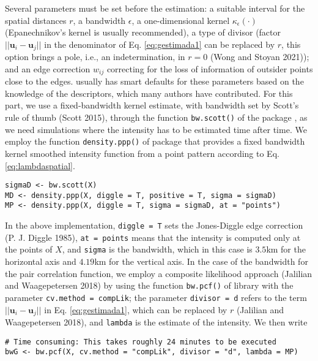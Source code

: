 Several parameters must be set before the estimation: a suitable interval for the spatial distances \(r\), a bandwidth \(\epsilon\), a one-dimensional kernel \(\kappa_{\epsilon}(\cdot)\) (Epanechnikov's kernel is usually recommended), a type of divisor (factor \(||\mathbf{u}_{i}-\mathbf{u}_{j}||\) in the denominator of Eq. \eqref{eq:gestimada1} can be replaced by \(r\), this option brings a pole, i.e., an indetermination, in \(r=0\) (Wong and Stoyan 2021)); and an edge correction \(w_{ij}\) correcting for the loss of information of outsider points close to the edges.  usually has smart defaults for these parameters based on the knowledge of the descriptors, which many authors have contributed. For this part, we use a fixed-bandwidth kernel estimate, with bandwidth set by Scott's rule of thumb (Scott 2015), through the function \texttt{bw.scott()} of the package , as we need simulations where the intensity has to be estimated time after time. We employ the function \texttt{density.ppp()} of package  that provides a fixed bandwidth kernel smoothed intensity function from a point pattern according to Eq. \eqref{eq:lambdaspatial}.

\begin{verbatim}
sigmaD <- bw.scott(X)
MD <- density.ppp(X, diggle = T, positive = T, sigma = sigmaD)
MP <- density.ppp(X, diggle = T, sigma = sigmaD, at = "points")
\end{verbatim}

In the above implementation, \texttt{diggle\ =\ T} sets the Jones-Diggle edge correction (P. J. Diggle 1985), \texttt{at\ =\ \textquotesingle{}points\textquotesingle{}} means that the intensity is computed only at the points of \(X\), and \texttt{sigma} is the bandwidth, which in this case is \(3.5\)km for the horizontal axis and \(4.19\)km for the vertical axis. In the case of the bandwidth for the pair correlation function, we employ a composite likelihood approach (Jalilian and Waagepetersen 2018) by using the function \texttt{bw.pcf()} of library  with the parameter \texttt{cv.method\ =\ \textquotesingle{}compLik\textquotesingle{}}; the parameter \texttt{divisor\ =\ \textquotesingle{}d\textquotesingle{}} refers to the term \(||\mathbf{u}_{i}-\mathbf{u}_{j}||\) in Eq. \eqref{eq:gestimada1}, which can be replaced by \(r\) (Jalilian and Waagepetersen 2018), and \texttt{lambda} is the estimate of the intensity. We then write

\begin{verbatim}
# Time consuming: This takes roughly 24 minutes to be executed 
bwG <- bw.pcf(X, cv.method = "compLik", divisor = "d", lambda = MP)
\end{verbatim}

